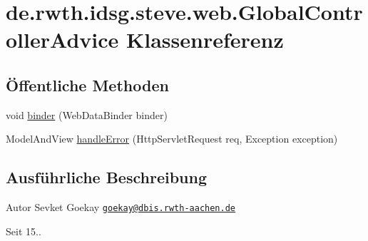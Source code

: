 \hypertarget{classde_1_1rwth_1_1idsg_1_1steve_1_1web_1_1_global_controller_advice}{\section{de.\-rwth.\-idsg.\-steve.\-web.\-Global\-Controller\-Advice Klassenreferenz}
\label{classde_1_1rwth_1_1idsg_1_1steve_1_1web_1_1_global_controller_advice}
}
\subsection*{Öffentliche Methoden}
\begin{DoxyCompactItemize}
\item 
void \hyperlink{classde_1_1rwth_1_1idsg_1_1steve_1_1web_1_1_global_controller_advice_ae47bdf466d11f7d57f801300a313ca94}{binder} (Web\-Data\-Binder binder)
\item 
Model\-And\-View \hyperlink{classde_1_1rwth_1_1idsg_1_1steve_1_1web_1_1_global_controller_advice_a136969ac19cd52b3510c0795f707d99c}{handle\-Error} (Http\-Servlet\-Request req, Exception exception)
\end{DoxyCompactItemize}


\subsection{Ausführliche Beschreibung}
\begin{DoxyAuthor}{Autor}
Sevket Goekay \href{mailto:goekay@dbis.rwth-aachen.de}{\tt goekay@dbis.\-rwth-\/aachen.\-de} 
\end{DoxyAuthor}
\begin{DoxySince}{Seit}
15.. 
\end{DoxySince}


